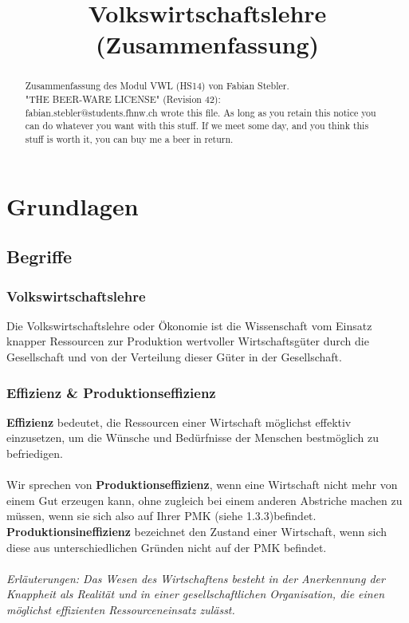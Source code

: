 \documentclass[10pt]{scrartcl}
\title{ %
Volkswirtschaftslehre
\vspace{0.2cm}
\Large (Zusammenfassung)}
\begin{document}
 \maketitle
 \thispagestyle{firststyle}
 \pagestyle{firststyle}
 \begin{abstract}
 \begin{center}
  Zusammenfassung des Modul VWL (HS14) von Fabian Stebler. \\
"THE BEER-WARE LICENSE" (Revision 42):\\
fabian.stebler@students.fhnw.ch wrote this file. As long as you retain this notice you
can do whatever you want with this stuff. If we meet some day, and you think
this stuff is worth it, you can buy me a beer in return.
 \end{center}
 \vspace{0.5cm}
\hrulefill
\end{abstract}

 \pagestyle{documentstyle}
 \tableofcontents
 \pagebreak
\section{Grundlagen}
\subsection{Begriffe}
\subsubsection{Volkswirtschaftslehre}
Die Volkswirtschaftslehre oder Ökonomie ist die Wissenschaft vom Einsatz knapper Ressourcen zur Produktion wertvoller Wirtschaftsgüter durch die Gesellschaft und von der Verteilung dieser Güter in der Gesellschaft.
\subsubsection{Effizienz \& Produktionseffizienz}
{\bf Effizienz} bedeutet, die Ressourcen einer Wirtschaft möglichst effektiv einzusetzen, um die Wünsche und Bedürfnisse der Menschen bestmöglich zu befriedigen. \\ \\
Wir sprechen von {\bf Produktionseffizienz}, wenn eine Wirtschaft nicht mehr von einem Gut erzeugen kann, ohne zugleich bei einem anderen Abstriche machen zu müssen, wenn sie sich also auf Ihrer PMK (siehe 1.3.3)befindet. {\bf Produktionsineffizienz} bezeichnet den Zustand einer Wirtschaft, wenn sich diese aus unterschiedlichen Gründen nicht auf der PMK befindet.
\\ \\
{\it Erläuterungen: Das Wesen des Wirtschaftens besteht in der Anerkennung der Knappheit als Realität und in einer gesellschaftlichen Organisation, die einen möglichst effizienten Ressourceneinsatz zulässt.}
\end{document}
